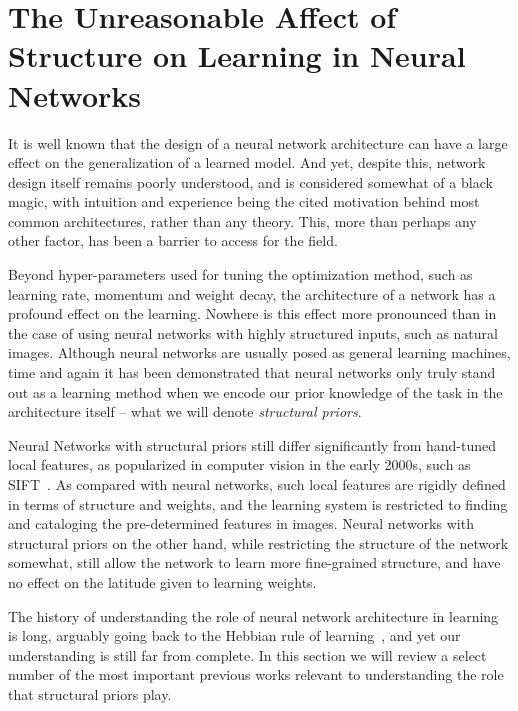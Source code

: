 \documentclass[thesis]{subfiles}
\begin{document}
	\chapter{The Unreasonable Affect of Structure on Learning in Neural Networks}
	\label{motivation}
	
	It is well known that the design of a neural network architecture can have a large effect on the generalization of a learned model. And yet, despite this, network design itself remains poorly understood, and is considered somewhat of a black magic, with intuition and experience being the cited motivation behind most common architectures, rather than any theory. This, more than perhaps any other factor, has been a barrier to access for the field.
	
	Beyond hyper-parameters used for tuning the optimization method, such as learning rate, momentum and weight decay, the architecture of a network has a profound effect on the learning. Nowhere is this effect more pronounced than in the case of using neural networks with highly structured inputs, such as natural images. Although neural networks are usually posed as general learning machines, time and again it has been demonstrated that neural networks only truly stand out as a learning method when we encode our prior knowledge of the task in the architecture itself -- what we will denote \emph{structural priors}. 
	
	Neural Networks with structural priors still differ significantly from hand-tuned local features, as popularized in computer vision in the early 2000s, such as SIFT~\citep{Lowe2004}. As compared with neural networks, such local features are rigidly defined in terms of structure and weights, and the learning system is restricted to finding and cataloging the pre-determined features in images. Neural networks with structural priors on the other hand, while restricting the structure of the network somewhat, still allow the network to learn more fine-grained structure, and have no effect on the latitude given to learning weights.
	
	
	The history of understanding the role of neural network architecture in learning is long, arguably going back to the Hebbian rule of learning~\citep{hebb1949organization}, and yet our understanding is still far from complete. In this section we will review a select number of the most important previous works relevant to understanding the role that structural priors play.
	
\end{document}
